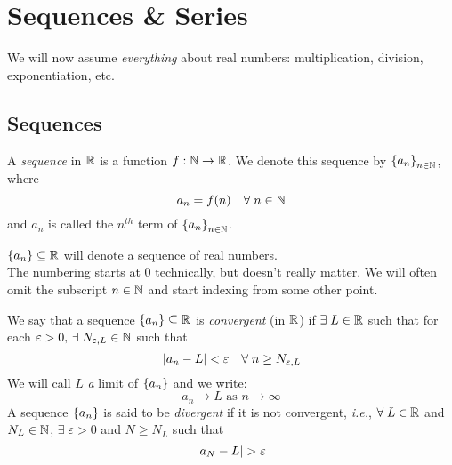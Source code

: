\section{Sequences \& Series}
We will now assume \emph{everything} about real numbers: multiplication, division, exponentiation, etc.

\subsection{Sequences} \vskip 5pt
\begin{defn} \label{defn:sequence}
    A \emph{sequence} in $\mathbb{R}$ is a function $f: \mathbb{N} \to \mathbb{R}$. We denote this sequence by $\set{a_{n}}_{n \in \N}$, where \[
        a_{n} = f(n) \quad \forall\; n \in \mathbb{N}
    \] and $a_{n}$ is called the $n^{th}$ term of $\set{a_{n}}_{n \in \N}$.
\end{defn}
\begin{rem}
    $\set{a_{n}} \subseteq \R$ will denote a sequence of real numbers. \\
    The numbering starts at 0 technically, but doesn't really matter. We will often omit the subscript $n \in \mathbb{N}$ and start indexing from some other point.
\end{rem}

\begin{defn} \label{defn:sequence:convergence}
    We say that a sequence $\set{a_{n}} \subseteq \R$ is \emph{convergent} (in $\mathbb{R}$) if $\exists\; L \in \mathbb{R}$ such that for each $\varepsilon > 0, \,\exists\; N_{\varepsilon,L} \in \mathbb{N}$ such that \[
        \abs{a_{n} - L} < \varepsilon \quad \forall\; n \geq N_{\varepsilon, L}
    \] 
    We will call $L$ \emph{a} limit of $\set{a_{n}}$ and we write: \[
        a_{n} \to L \text{ as } n \to \infty
    \]
    A sequence $\set{a_{n}}$ is said to be \emph{divergent} if it is not convergent, \textit{i.e.}, $\forall\; L \in \mathbb{R}$ and $N_{L} \in \mathbb{N}$, $\exists\; \varepsilon > 0$ and $N \geq N_{L}$ such that \[
        \abs{a_{N} - L} > \varepsilon
    \]
\end{defn}

